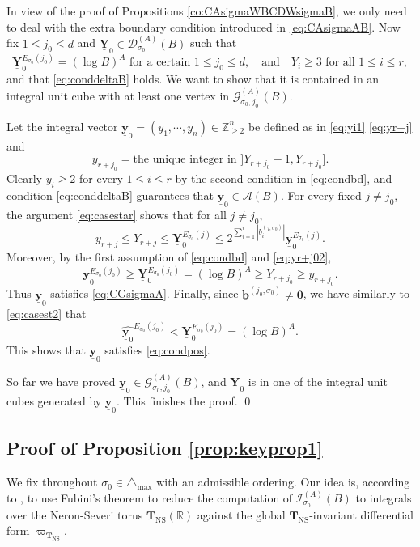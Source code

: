 \documentclass[11pt,letterpaper]{amsart}
\newcommand{\BR}{{\mathbb {R}}}
\newcommand{\BZ}{{\mathbb {Z}}}
\newcommand{\CA}{{\mathcal {A}}}
\newcommand{\CD}{{\mathcal {D}}}
\newcommand{\CG}{{\mathcal {G}}}
\newcommand{\CI}{{\mathcal {I}}}
\newcommand{\YY}{\underline{\mathbf{Y}}}
\newcommand{\yy}{\underline{\mathbf{y}}}
\newcommand{\bb}{\underline{\mathbf{b}}}
\newcommand{\CTNS}{\mathbf{T}_{\operatorname{NS}}}
\theoremstyle{plain}
\numberwithin{equation}{section}
\theoremstyle{definition}
\theoremstyle{remark}
\begin{document}
In view of the proof of Propositions \ref{co:CAsigmaWBCDWsigmaB}, we only need to deal with the extra boundary condition introduced in \eqref{eq:CAsigmaAB}. Now fix $1\leqslant j_0\leqslant d$ and $\YY_0\in\CD_{\sigma_0}^{(A)}(B)$ such that 
\begin{equation}\label{eq:condbd}
	\YY_0^{E_{\sigma_0}(j_0)}=(\log B)^A\text{ for a certain }1\leqslant j_0\leqslant d,\quad\text{and}\quad Y_i\geqslant 3\text{ for all }1\leqslant i\leqslant r,
\end{equation}  and that \eqref{eq:conddeltaB} holds.
We want to show that it is contained in an integral unit cube with at least one vertex in $\CG^{(A)}_{\sigma_0,j_0}(B)$.

Let the integral vector $\yy_{0}=(y_1,\cdots,y_n)\in\BZ_{\geqslant 2}^n$ be defined as in \eqref{eq:yi1} \eqref{eq:yr+j} and
\begin{equation}\label{eq:yr+j02}
	y_{r+j_0}=\text{the unique integer in } ]Y_{r+j_0}-1,Y_{r+j_0}].
\end{equation}
Clearly $y_i\geqslant 2$ for every $1\leqslant i\leqslant r$ by the second condition in \eqref{eq:condbd}, and condition \eqref{eq:conddeltaB} guarantees that $\yy_{0}\in\CA(B)$.  
For every fixed $j\neq j_0$, the argument \eqref{eq:casestar} shows that for all $j\neq j_0$,
$$y_{r+j}\leqslant Y_{r+j}\leqslant \YY_0^{E_{\sigma_0}(j)}\leqslant 2^{\sum_{i=1}^{r}|b_i^{(j,\sigma_0)}|}\yy_0^{E_{\sigma_0}(j)}.$$
Moreover, by the first assumption of \eqref{eq:condbd} and \eqref{eq:yr+j02}, $$\yy_0^{E_{\sigma_0}(j_0)}\geqslant \YY_0^{E_{\sigma_0}(j_0)}=(\log B)^A\geqslant Y_{r+j_0}\geqslant y_{r+j_0}.$$   Thus $\yy_0$ satisfies \eqref{eq:CGsigmaA}.
Finally, since $\bb^{(j_0,\sigma_0)}\neq \mathbf{0}$, we have similarly to \eqref{eq:casest2} that
$$\widehat{\yy_0}^{E_{\sigma_0}(j_0)}<\YY_0^{E_{\sigma_0}(j_0)}=(\log B)^A.$$ This shows that $\yy_0$ satisfies \eqref{eq:condpos}.  

So far we have proved $\yy_0\in\CG^{(A)}_{\sigma_0,j_0}(B)$, and $\YY_0$ is in one of the integral unit cubes generated by $\yy_0$. This finishes the proof.
\qed



\subsection{Proof of Proposition \ref{prop:keyprop1}}\label{se:intvandercorput}
We fix throughout $\sigma_0\in\triangle_{\max}$ with an admissible ordering.
Our idea is, according to \cite[p. 249--p. 250]{Salberger}, to use Fubini's theorem to reduce the computation of $\CI^{(A)}_{\sigma_0}(B)$  to integrals over the Neron-Severi torus $\CTNS(\BR)$ against the global $\CTNS$-invariant differential form $\varpi_{\CTNS}$.
\end{document}
